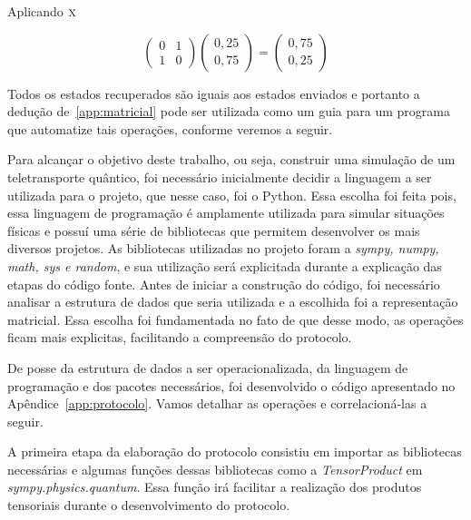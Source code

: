 Aplicando \(\operatorname{\textsc{x}}\)

\begin{equation}
\begin{pmatrix}
0 & 1 \\
1 & 0
\end{pmatrix} \begin{pmatrix}
0,25 \\
0,75
\end{pmatrix} = \begin{pmatrix}
0,75 \\
0,25
\end{pmatrix}
\end{equation}

Todos os estados recuperados são iguais aos estados enviados e portanto a dedução de~\ref{app:matricial} pode ser utilizada como um guia para um programa que automatize tais operações, conforme veremos a seguir.

Para alcançar o objetivo deste trabalho, ou seja, construir uma simulação de um teletransporte quântico, foi necessário inicialmente decidir a linguagem a ser utilizada para o projeto, que nesse caso, foi o Python. Essa escolha foi feita pois, essa linguagem de programação é amplamente utilizada para simular situações físicas e possuí uma série de bibliotecas que permitem desenvolver os mais diversos projetos. As bibliotecas utilizadas no projeto foram a \textit{sympy, numpy, math, sys e random}, e sua utilização será explicitada durante a explicação das etapas do código fonte. Antes de iniciar a construção do código, foi necessário analisar a estrutura de dados que seria utilizada e a escolhida foi a representação matricial. Essa escolha foi fundamentada no fato de que desse modo, as operações ficam mais explicitas, facilitando a compreensão do protocolo.

De posse da estrutura de dados a ser operacionalizada, da linguagem de programação e dos pacotes necessários, foi desenvolvido o código apresentado no Apêndice~\ref{app:protocolo}. Vamos detalhar as operações e correlacioná-las a seguir.

A primeira etapa da elaboração do protocolo consistiu em importar as bibliotecas necessárias e algumas funções dessas bibliotecas como a \textit{TensorProduct} em \textit{sympy.physics.quantum}. Essa função irá facilitar a realização dos produtos tensoriais durante o desenvolvimento do protocolo.

